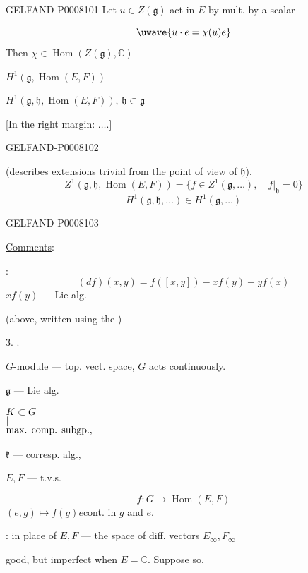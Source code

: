 \begin{GelfandAdjacentEvidence}{GELFAND-P000810}{1}
Let \(\underline{\underline{u\in Z(\mathfrak g)}}\) act in \(E\) by mult. by a scalar
\[
\text{\uwave{\(\displaystyle u\cdot e=\chi(u)e\)}}
\]
Then \(\chi\in\operatorname{Hom}(Z(\mathfrak g),\mathbb C)\)


\(H^1(\mathfrak g,\operatorname{Hom}(E,F))\) — 

\(H^1(\mathfrak g,\mathfrak h,\operatorname{Hom}(E,F))\),\qquad
\(\mathfrak h\subset\mathfrak g\)

[In the right margin: \(\ldots\).]
\end{GelfandAdjacentEvidence}
\begin{GelfandAdjacentEvidence}{GELFAND-P000810}{2}


(describes extensions trivial from the point of view of \(\mathfrak h\)).
\[
Z^1(\mathfrak g,\mathfrak h,\operatorname{Hom}(E,F))
=\{f\in Z^1(\mathfrak g,\ldots),\quad f|_{\mathfrak h}=0\}
\]
\[
H^1(\mathfrak g,\mathfrak h,\ldots)\in H^1(\mathfrak g,\ldots)
\]
\end{GelfandAdjacentEvidence}
\begin{GelfandAdjacentEvidence}{GELFAND-P000810}{3}


\uline{Comments}:

:
\[
(df)(x,y)=f([x,y])-xf(y)+yf(x)
\]
\(xf(y)\) —  Lie alg.

(above, written using the )

3. .

\(G\)-module — top. vect. space, \(G\) acts continuously.

\(\mathfrak g\) — Lie alg.

\(\begin{array}{@{}l@{}} K\subset G\\[-3pt] \vert\\[-3pt]\text{max. comp. subgp.},\end{array}\)

\(\mathfrak k\) — corresp. alg.,

\(E,F\) — t.v.s.

\quad {}
\[
f:G\longrightarrow\operatorname{Hom}(E,F)
\]
\((e,g)\longmapsto f(g)e\)\qquad cont. in \(g\) and \(e\).

: in place of \(E,F\) — the space of diff. vectors \(E_\infty,F_\infty\)

good, but imperfect when \(\underline{\underline{E=\mathbb C}}\). Suppose so.
\end{GelfandAdjacentEvidence}
